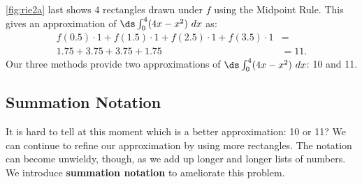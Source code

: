 {%
\autoref{fig:rie2a} last shows 4 rectangles drawn under $f$ using the Midpoint Rule.
This gives an approximation of $\ds\int_0^4(4x-x^2)\ dx$ as:
\begin{align*} f(0.5)\cdot 1 + f(1.5)\cdot 1+ f(2.5)\cdot 1+f(3.5)\cdot 1 &=\\
	1.75+3.75+3.75+1.75&= 11.
\end{align*}
Our three methods provide two approximations of $\ds\int_0^4(4x-x^2)\ dx$: 10 and 11.}

\subsection{Summation Notation}

It is hard to tell at this moment which is a better approximation: 10 or 11? We can continue to refine our approximation by using more rectangles. The notation can become unwieldy, though, as we add up longer and longer lists of numbers. We introduce \textbf{summation notation} to ameliorate this problem. 

